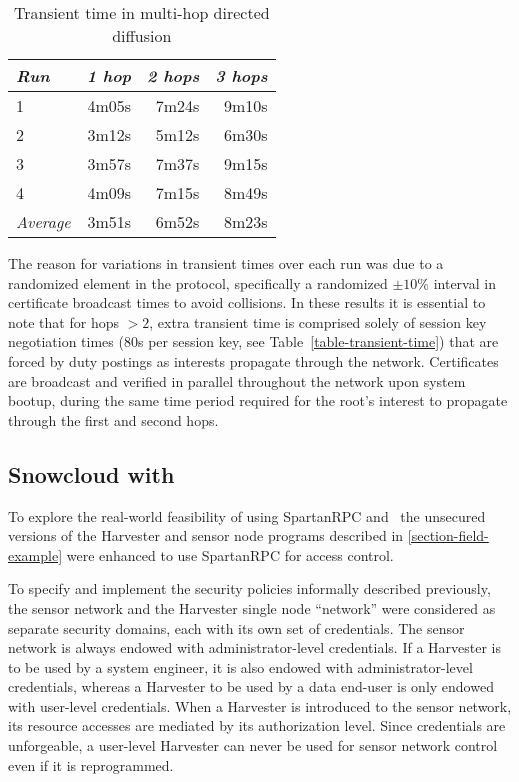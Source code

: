\begin{table}[tbhp]
  \newcommand\T{\rule{0pt}{2.1ex}}
  \centering
  \caption{Transient time in multi-hop directed diffusion}
  {
  \begin{tabular}{|l|r|r|r|} \hline
    \textit{Run} \T & \textit{1 hop }
                    & \textit{2 hops}
                    & \textit{3 hops} \\ \hline \hline

                   1 \T &  4m05s & 7m24s & 9m10s \\ \hline
                   2 \T &  3m12s & 5m12s & 6m30s \\ \hline
                   3 \T &  3m57s & 7m37s & 9m15s \\ \hline
                   4 \T &  4m09s & 7m15s & 8m49s \\ \hline
    \textit{Average} \T &  3m51s & 6m52s & 8m23s \\ \hline
  \end{tabular}
  }
  \label{table-multi-hop-transient}
\end{table}

The reason for variations in transient times over each run was due to a randomized element in
the protocol, specifically a randomized $\pm 10\%$ interval in certificate broadcast times to
avoid collisions. In these results it is essential to note that for hops $> 2$, extra transient
time is comprised solely of session key negotiation times (80s per session key, see
Table~\ref{table-transient-time}) that are forced by duty postings as interests propagate
through the network. Certificates are broadcast and verified in parallel throughout the network
upon system bootup, during the same time period required for the root's interest to propagate
through the first and second hops.

\subsection{Snowcloud with \Sprocket}
\label{section-snowcloud-sprocket}

To explore the real-world feasibility of using SpartanRPC and \Sprocket\, the unsecured versions
of the Harvester and sensor node programs described in \autoref{section-field-example} were
enhanced to use SpartanRPC for access control.

To specify and implement the security policies informally described previously, the sensor
network and the Harvester single node ``network'' were considered as separate security domains,
each with its own set of credentials. The sensor network is always endowed with
administrator-level credentials. If a Harvester is to be used by a system engineer, it is also
endowed with administrator-level credentials, whereas a Harvester to be used by a data end-user
is only endowed with user-level credentials. When a Harvester is introduced to the sensor
network, its resource accesses are mediated by its authorization level. Since credentials are
unforgeable, a user-level Harvester can never be used for sensor network control even if it is
reprogrammed.

